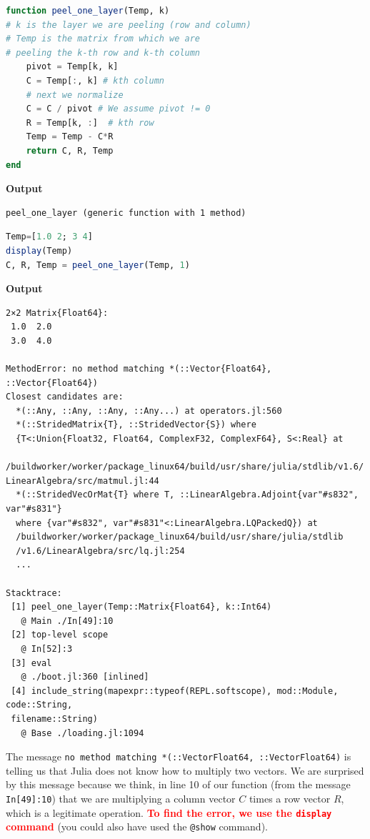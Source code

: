 \begin{lstlisting}[language=Julia,style=mystyle]
function peel_one_layer(Temp, k)
# k is the layer we are peeling (row and column)
# Temp is the matrix from which we are
# peeling the k-th row and k-th column
    pivot = Temp[k, k]
    C = Temp[:, k] # kth column
    # next we normalize
    C = C / pivot # We assume pivot != 0
    R = Temp[k, :]  # kth row
    Temp = Temp - C*R
    return C, R, Temp
end
\end{lstlisting}
\textbf{Output} 
\begin{verbatim}
peel_one_layer (generic function with 1 method)
\end{verbatim}

\begin{lstlisting}[language=Julia,style=mystyle]
Temp=[1.0 2; 3 4]
display(Temp)
C, R, Temp = peel_one_layer(Temp, 1)
\end{lstlisting}
\textbf{Output} 
\begin{verbatim}
2×2 Matrix{Float64}:
 1.0  2.0
 3.0  4.0
 
MethodError: no method matching *(::Vector{Float64}, ::Vector{Float64})
Closest candidates are:
  *(::Any, ::Any, ::Any, ::Any...) at operators.jl:560
  *(::StridedMatrix{T}, ::StridedVector{S}) where 
  {T<:Union{Float32, Float64, ComplexF32, ComplexF64}, S<:Real} at
  /buildworker/worker/package_linux64/build/usr/share/julia/stdlib/v1.6/
LinearAlgebra/src/matmul.jl:44
  *(::StridedVecOrMat{T} where T, ::LinearAlgebra.Adjoint{var"#s832", var"#s831"} 
  where {var"#s832", var"#s831"<:LinearAlgebra.LQPackedQ}) at 
  /buildworker/worker/package_linux64/build/usr/share/julia/stdlib
  /v1.6/LinearAlgebra/src/lq.jl:254
  ...

Stacktrace:
 [1] peel_one_layer(Temp::Matrix{Float64}, k::Int64)
   @ Main ./In[49]:10
 [2] top-level scope
   @ In[52]:3
 [3] eval
   @ ./boot.jl:360 [inlined]
 [4] include_string(mapexpr::typeof(REPL.softscope), mod::Module, code::String, 
 filename::String)
   @ Base ./loading.jl:1094
\end{verbatim}

The message \texttt{no method matching *(::Vector{Float64}, ::Vector{Float64})} is telling us that Julia does not know how to multiply two vectors. We are surprised by this message because we think, in line 10 of our function (from the message \texttt{In[49]:10}) that we are multiplying a column vector $C$ times a row vector $R$, which is a legitimate operation. \textcolor{red}{\bf To find the error, we use the \texttt{display} command} (you could also have used the \texttt{@show} command).


